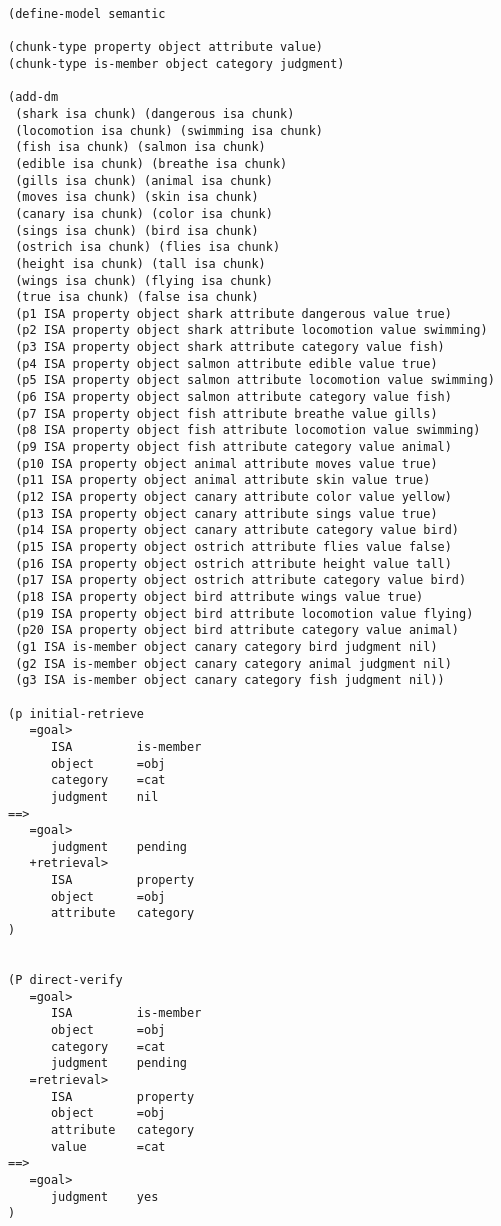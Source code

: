 \raggedbottom
\begin{lstlisting}[caption={ACT-R production rules for the semantic model}]
(define-model semantic

(chunk-type property object attribute value)
(chunk-type is-member object category judgment)

(add-dm
 (shark isa chunk) (dangerous isa chunk)
 (locomotion isa chunk) (swimming isa chunk) 
 (fish isa chunk) (salmon isa chunk)
 (edible isa chunk) (breathe isa chunk)
 (gills isa chunk) (animal isa chunk)
 (moves isa chunk) (skin isa chunk)
 (canary isa chunk) (color isa chunk)
 (sings isa chunk) (bird isa chunk) 
 (ostrich isa chunk) (flies isa chunk) 
 (height isa chunk) (tall isa chunk)
 (wings isa chunk) (flying isa chunk) 
 (true isa chunk) (false isa chunk) 
 (p1 ISA property object shark attribute dangerous value true)
 (p2 ISA property object shark attribute locomotion value swimming)
 (p3 ISA property object shark attribute category value fish)
 (p4 ISA property object salmon attribute edible value true)
 (p5 ISA property object salmon attribute locomotion value swimming)
 (p6 ISA property object salmon attribute category value fish)
 (p7 ISA property object fish attribute breathe value gills)
 (p8 ISA property object fish attribute locomotion value swimming)
 (p9 ISA property object fish attribute category value animal)
 (p10 ISA property object animal attribute moves value true)
 (p11 ISA property object animal attribute skin value true)
 (p12 ISA property object canary attribute color value yellow)
 (p13 ISA property object canary attribute sings value true)
 (p14 ISA property object canary attribute category value bird)
 (p15 ISA property object ostrich attribute flies value false)
 (p16 ISA property object ostrich attribute height value tall)
 (p17 ISA property object ostrich attribute category value bird)
 (p18 ISA property object bird attribute wings value true)
 (p19 ISA property object bird attribute locomotion value flying)
 (p20 ISA property object bird attribute category value animal)
 (g1 ISA is-member object canary category bird judgment nil)
 (g2 ISA is-member object canary category animal judgment nil)
 (g3 ISA is-member object canary category fish judgment nil))

(p initial-retrieve
   =goal>
      ISA         is-member
      object      =obj
      category    =cat
      judgment    nil
==>
   =goal>
      judgment    pending
   +retrieval>  
      ISA         property
      object      =obj
      attribute   category
)


(P direct-verify
   =goal>
      ISA         is-member
      object      =obj
      category    =cat
      judgment    pending
   =retrieval>
      ISA         property
      object      =obj
      attribute   category
      value       =cat
==>
   =goal>
      judgment    yes
)


\end{lstlisting}
